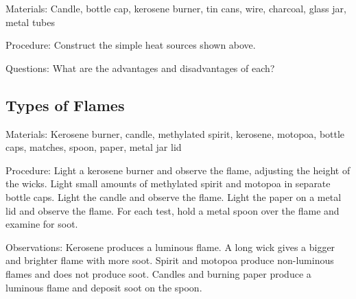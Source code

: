 \begin{multicols}{2}
\begin{description*}
\item[Materials:]{Candle, bottle cap, kerosene burner, tin cans, wire, charcoal, glass jar, metal tubes}
\item[Procedure:]{Construct the simple heat sources shown above.}
\item[Questions:]{What are the advantages and disadvantages of each?}
\end{description*}

\subsection{Types of Flames}


\begin{description*}
\item[Materials:]{Kerosene burner, candle, methylated spirit, kerosene, motopoa, bottle caps, matches, spoon, paper, metal jar lid}
\item[Procedure:]{Light a kerosene burner and observe the flame, adjusting the height of the wicks. Light small amounts of methylated spirit and motopoa in separate bottle caps. Light the candle and observe the flame. Light the paper on a metal lid and observe the flame. For each test, hold a metal spoon over the flame and examine for soot.}
\item[Observations:]{Kerosene produces a luminous flame. A long wick gives a bigger and brighter flame with more soot. Spirit and motopoa produce non-luminous flames and does not produce soot. Candles and burning paper produce a luminous flame and deposit soot on the spoon.}
\end{description*}



\end{multicols}

\pagebreak